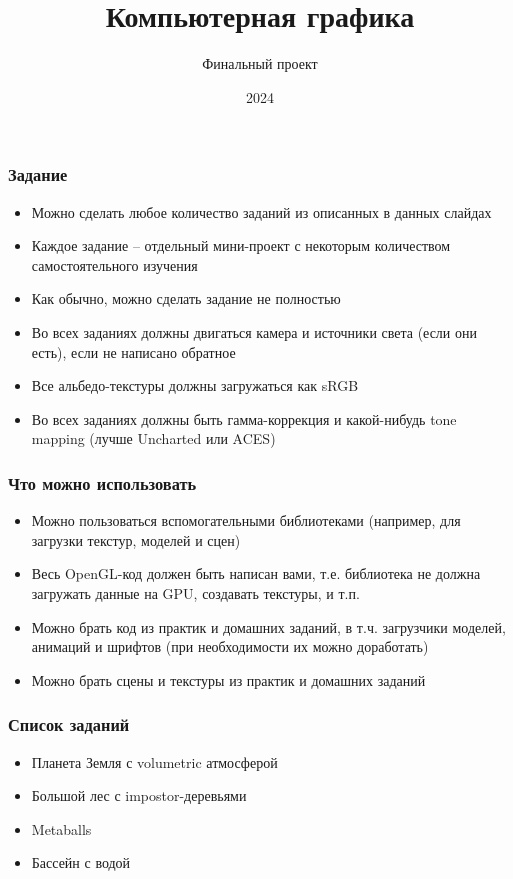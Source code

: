 \documentclass{beamer}
\title{Компьютерная графика}
\subtitle{Финальный проект}
\date{2024}
\begin{document}
\frame{\titlepage}

\begin{frame}[fragile]
\frametitle{Задание}
\begin{itemize}
\item Можно сделать любое количество заданий из описанных в данных слайдах
\pause
\item Каждое задание -- отдельный мини-проект с некоторым количеством самостоятельного изучения
\pause
\item Как обычно, можно сделать задание не полностью
\pause
\item Во всех заданиях должны двигаться камера и источники света (если они есть), если не написано обратное
\pause
\item Все альбедо-текстуры должны загружаться как sRGB
\pause
\item Во всех заданиях должны быть гамма-коррекция и какой-нибудь tone mapping (лучше Uncharted или ACES)
\end{itemize}
\end{frame}

\begin{frame}[fragile]
\frametitle{Что можно использовать}
\begin{itemize}
\item Можно пользоваться вспомогательными библиотеками (например, для загрузки текстур, моделей и сцен)
\pause
\item Весь OpenGL-код должен быть написан вами, т.е. библиотека не должна загружать данные на GPU, создавать текстуры, и т.п.
\pause
\item Можно брать код из практик и домашних заданий, в т.ч. загрузчики моделей, анимаций и шрифтов (при необходимости их можно доработать)
\pause
\item Можно брать сцены и текстуры из практик и домашних заданий
\end{itemize}
\end{frame}

\begin{frame}[fragile]
\frametitle{Список заданий}
\begin{itemize}
\item Планета Земля с volumetric атмосферой
\item Большой лес с impostor-деревьями
\item Metaballs
\item Бассейн с водой
\end{itemize}
\end{frame}
\end{document}

